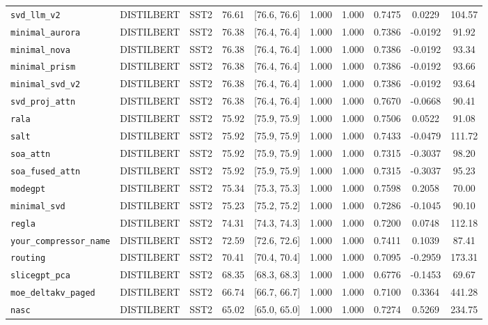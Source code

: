 \begin{table}[t]
\begin{tabular}{l l l c c c c c c c}
\texttt{svd\_llm\_v2} & DISTILBERT & SST2 & 76.61 & [76.6, 76.6] & 1.000 & 1.000 & 0.7475 & 0.0229 & 104.57 \\
\texttt{minimal\_aurora} & DISTILBERT & SST2 & 76.38 & [76.4, 76.4] & 1.000 & 1.000 & 0.7386 & -0.0192 & 91.92 \\
\texttt{minimal\_nova} & DISTILBERT & SST2 & 76.38 & [76.4, 76.4] & 1.000 & 1.000 & 0.7386 & -0.0192 & 93.34 \\
\texttt{minimal\_prism} & DISTILBERT & SST2 & 76.38 & [76.4, 76.4] & 1.000 & 1.000 & 0.7386 & -0.0192 & 93.66 \\
\texttt{minimal\_svd\_v2} & DISTILBERT & SST2 & 76.38 & [76.4, 76.4] & 1.000 & 1.000 & 0.7386 & -0.0192 & 93.64 \\
\texttt{svd\_proj\_attn} & DISTILBERT & SST2 & 76.38 & [76.4, 76.4] & 1.000 & 1.000 & 0.7670 & -0.0668 & 90.41 \\
\texttt{rala} & DISTILBERT & SST2 & 75.92 & [75.9, 75.9] & 1.000 & 1.000 & 0.7506 & 0.0522 & 91.08 \\
\texttt{salt} & DISTILBERT & SST2 & 75.92 & [75.9, 75.9] & 1.000 & 1.000 & 0.7433 & -0.0479 & 111.72 \\
\texttt{soa\_attn} & DISTILBERT & SST2 & 75.92 & [75.9, 75.9] & 1.000 & 1.000 & 0.7315 & -0.3037 & 98.20 \\
\texttt{soa\_fused\_attn} & DISTILBERT & SST2 & 75.92 & [75.9, 75.9] & 1.000 & 1.000 & 0.7315 & -0.3037 & 95.23 \\
\texttt{modegpt} & DISTILBERT & SST2 & 75.34 & [75.3, 75.3] & 1.000 & 1.000 & 0.7598 & 0.2058 & 70.00 \\
\texttt{minimal\_svd} & DISTILBERT & SST2 & 75.23 & [75.2, 75.2] & 1.000 & 1.000 & 0.7286 & -0.1045 & 90.10 \\
\texttt{regla} & DISTILBERT & SST2 & 74.31 & [74.3, 74.3] & 1.000 & 1.000 & 0.7200 & 0.0748 & 112.18 \\
\texttt{your\_compressor\_name} & DISTILBERT & SST2 & 72.59 & [72.6, 72.6] & 1.000 & 1.000 & 0.7411 & 0.1039 & 87.41 \\
\texttt{routing} & DISTILBERT & SST2 & 70.41 & [70.4, 70.4] & 1.000 & 1.000 & 0.7095 & -0.2959 & 173.31 \\
\texttt{slicegpt\_pca} & DISTILBERT & SST2 & 68.35 & [68.3, 68.3] & 1.000 & 1.000 & 0.6776 & -0.1453 & 69.67 \\
\texttt{moe\_deltakv\_paged} & DISTILBERT & SST2 & 66.74 & [66.7, 66.7] & 1.000 & 1.000 & 0.7100 & 0.3364 & 441.28 \\
\texttt{nasc} & DISTILBERT & SST2 & 65.02 & [65.0, 65.0] & 1.000 & 1.000 & 0.7274 & 0.5269 & 234.75 \\

\end{tabular}
\end{table}
